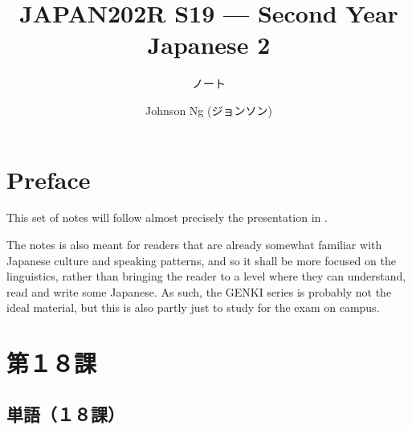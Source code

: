 \documentclass[notoc,notitlepage]{tufte-book}
\title{JAPAN202R S19 --- Second Year Japanese 2}
\author{Johnson Ng (ジョンソン)}
\subtitle{ノート}
\begin{document}
% 
\makeatletter
\fancyhead[LE]{\thepage \enspace \textsl{\leftmark}}
\makeatother

\hypersetup{pageanchor=false}
\maketitle
\hypersetup{pageanchor=true}
\begin{fullwidth}
\tableofcontents
\end{fullwidth}

\makeatletter
\fancyhead[LE]{\thepage \enspace \textsl{\leftmark \enspace \rightmark}}
\makeatother

\chapter*{Preface}%
\label{chp:preface}

This set of notes will follow almost precisely the presentation in
\citealt{banno1999}.

The notes is also meant for readers that are already somewhat familiar
with Japanese culture and speaking patterns, and so it shall be more
focused on the linguistics, rather than bringing the reader
to a level where they can understand, read and write some Japanese.
As such, the GENKI series is probably not the ideal material,
but this is also partly just to study for the exam on campus.


\chapter{第１８課}%
\label{chp:dai_18_ka}

\section{単語（１８課）}%
\label{sec:tango_c18}
\end{document}
